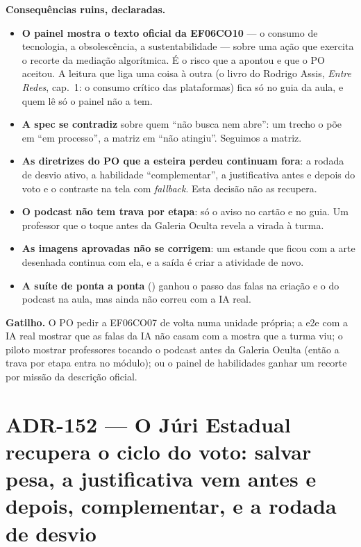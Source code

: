 \textbf{Consequências ruins, declaradas.}

\begin{itemize}
  \item \textbf{O painel mostra o texto oficial da EF06CO10} --- o consumo de
    tecnologia, a obsolescência, a sustentabilidade --- sobre uma ação que
    exercita o recorte da mediação algorítmica. É o risco que a 
    apontou e que o PO aceitou. A leitura que liga uma coisa à outra (o livro
    do Rodrigo Assis, \emph{Entre Redes}, cap.~1: o consumo crítico das
    plataformas) fica só no guia da aula, e quem lê só o painel não a tem.
  \item \textbf{A spec se contradiz} sobre quem \enquote{não busca nem abre}:
    um trecho o põe em \enquote{em processo}, a matriz em \enquote{não
    atingiu}. Seguimos a matriz.
  \item \textbf{As diretrizes do PO que a esteira perdeu continuam fora}: a
    rodada de desvio ativo, a habilidade \enquote{complementar}, a
    justificativa antes e depois do voto e o contraste na tela com
    \emph{fallback}. Esta decisão não as recupera.
  \item \textbf{O podcast não tem trava por etapa}: só o aviso no cartão e no
    guia. Um professor que o toque antes da Galeria Oculta revela a virada à
    turma.
  \item \textbf{As imagens aprovadas não se corrigem}: um estande que ficou
    com a arte desenhada continua com ela, e a saída é criar a atividade de
    novo.
  \item \textbf{A suíte de ponta a ponta} () ganhou
    o passo das falas na criação e o do podcast na aula, mas ainda não correu
    com a IA real.
\end{itemize}

\textbf{Gatilho.} O PO pedir a EF06CO07 de volta numa unidade própria; a e2e
com a IA real mostrar que as falas da IA não casam com a mostra que a turma
viu; o piloto mostrar professores tocando o podcast antes da Galeria Oculta
(então a trava por etapa entra no módulo); ou o painel de habilidades ganhar um
recorte por missão da descrição oficial.

\section{ADR-152 --- O Júri Estadual recupera o ciclo do voto: salvar pesa, a justificativa vem antes e depois, complementar, e a rodada de desvio}
\label{adr:exp06ef1b-ciclo-do-voto}

